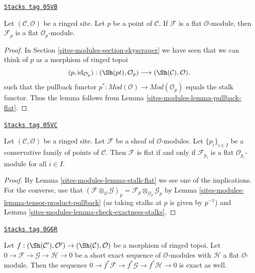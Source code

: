 \begin{lemma}
\label{sites-modules-lemma-stalk-flat}
\href{https://stacks.math.columbia.edu/tag/05VB}{\texttt{Stacks tag 05VB}}

Let $(\mathcal{C}, \mathcal{O})$ be a ringed site.
Let $p$ be a point of $\mathcal{C}$.
If $\mathcal{F}$ is a flat $\mathcal{O}$-module, then
$\mathcal{F}_p$ is a flat $\mathcal{O}_p$-module.
\end{lemma}

\begin{proof}
In Section \ref{sites-modules-section-skyscraper} we have seen
that we can think of $p$ as a morphism of ringed topoi
$$
(p, \text{id}_{\mathcal{O}_p}) :
(\Sh(pt), \mathcal{O}_p)
\longrightarrow
(\Sh(\mathcal{C}), \mathcal{O}).
$$
such that the pullback functor
$p^* : \textit{Mod}(\mathcal{O}) \to \textit{Mod}(\mathcal{O}_p)$
equals the stalk functor. Thus the lemma follows from
Lemma \ref{sites-modules-lemma-pullback-flat}.
\end{proof}

\begin{lemma}
\label{sites-modules-lemma-check-flat-stalks}
\href{https://stacks.math.columbia.edu/tag/05VC}{\texttt{Stacks tag 05VC}}

Let $(\mathcal{C}, \mathcal{O})$ be a ringed site.
Let $\mathcal{F}$ be a sheaf of $\mathcal{O}$-modules.
Let $\{p_i\}_{i \in I}$ be a conservative family of points of $\mathcal{C}$.
Then $\mathcal{F}$ is flat if and only if $\mathcal{F}_{p_i}$ is
a flat $\mathcal{O}_{p_i}$-module for all $i \in I$.
\end{lemma}

\begin{proof}
By
Lemma \ref{sites-modules-lemma-stalk-flat}
we see one of the implications.
For the converse, use that
$(\mathcal{F} \otimes_\mathcal{O} \mathcal{G})_p =
\mathcal{F}_p \otimes_{\mathcal{O}_p} \mathcal{G}_p$
by
Lemma \ref{sites-modules-lemma-tensor-product-pullback} (as taking stalks at $p$
is given by $p^{-1}$) and
Lemma \ref{sites-modules-lemma-check-exactness-stalks}.
\end{proof}

\begin{lemma}
\label{sites-modules-lemma-pullback-ses}
\href{https://stacks.math.columbia.edu/tag/0G6R}{\texttt{Stacks tag 0G6R}}

Let
$f : (\Sh(\mathcal{C}'), \mathcal{O}') \to (\Sh(\mathcal{C}), \mathcal{O})$
be a morphism of ringed topoi. Let
$0 \to \mathcal{F} \to \mathcal{G} \to \mathcal{H} \to 0$
be a short exact sequence of $\mathcal{O}$-modules with $\mathcal{H}$
a flat $\mathcal{O}$-module. Then the sequence
$0 \to f^*\mathcal{F} \to f^*\mathcal{G} \to f^*\mathcal{H} \to 0$
is exact as well.
\end{lemma}

